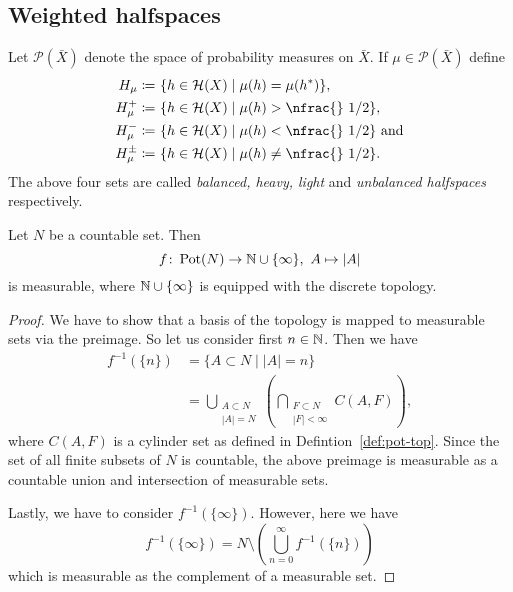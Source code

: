 \subsection{Weighted halfspaces}
\label{sec:weight}

\begin{defin}
  Let \(\mathcal{P}(\bar X)\) denote the space of probability measures on \(\bar X\). If \(\mu \in \mathcal{P}(\bar X)\) define
  \begin{align*}
    H_\mu \coloneqq &\ \{h \in \mathcal{H}(X) \mid \mu(h) = \mu(h^\ast)\},\\
    H_\mu^+ \coloneqq &\ \{h \in \mathcal{H}(X) \mid \mu(h) > \text{\nfrac{} 1/2} \},\\
    H_\mu^- \coloneqq &\ \{h \in \mathcal{H}(X) \mid \mu(h) < \text{\nfrac{} 1/2}\} \text{ and}\\
    H_\mu^\pm \coloneqq &\ \{h \in \mathcal{H}(X) \mid \mu(h) \neq \text{\nfrac{} 1/2}\}.
  \end{align*}
  The above four sets are called \emph{balanced, heavy, light} and \emph{unbalanced halfspaces} respectively.
\end{defin}

\begin{lemma}
  Let \(N\) be a countable set. Then
  \[
    f\colon \operatorname{Pot}(N) \to \mathbb{N} \cup \{\infty\},\ A \mapsto |A|
  \]
  is measurable, where \(\mathbb{N} \cup \{\infty\}\) is equipped with the discrete topology.
\end{lemma}
\begin{proof}
  We have to show that a basis of the topology is mapped to measurable sets via the preimage. So let us consider first \(n \in \mathbb{N}\). Then we have
  \begin{align*}
    f^{-1}(\{n\})
    & = \{ A \subset N \mid |A| = n\}\\
    & = \bigcup_{\substack{A \subset N\\|A| = N}} \left ( \bigcap_{\substack{F \subset N\\|F|< \infty}}C(A,F)\right),
  \end{align*}
  where \(C(A,F)\) is a cylinder set as defined in Defintion~\ref{def:pot-top}. Since the set of all finite subsets of \(N\) is countable, the above preimage is measurable as a countable union and intersection of measurable sets.

  Lastly, we have to consider \(f^{-1}(\{\infty\})\). However, here we have
  \[
    f^{-1}(\{\infty\}) = N \setminus \left (\bigcup_{n=0}^\infty f^{-1}(\{n\})\right)
  \]
  which is measurable as the complement of a measurable set.
\end{proof}

